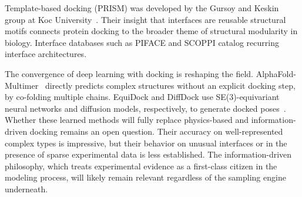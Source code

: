 Template-based docking (PRISM) was developed by the Gursoy and Keskin group at Koc University~\cite{tuncbag2011prism}.
Their insight that interfaces are reusable structural motifs connects protein docking to the broader theme of structural modularity in biology.
Interface databases such as PIFACE and SCOPPI catalog recurring interface architectures.

The convergence of deep learning with docking is reshaping the field.
AlphaFold-Multimer~\cite{evans2022} directly predicts complex structures without an explicit docking step, by co-folding multiple chains.
EquiDock and DiffDock use SE(3)-equivariant neural networks and diffusion models, respectively, to generate docked poses~\cite{ganea2022,corso2023}.
Whether these learned methods will fully replace physics-based and information-driven docking remains an open question.
Their accuracy on well-represented complex types is impressive, but their behavior on unusual interfaces or in the presence of sparse experimental data is less established.
The information-driven philosophy, which treats experimental evidence as a first-class citizen in the modeling process, will likely remain relevant regardless of the sampling engine underneath.
